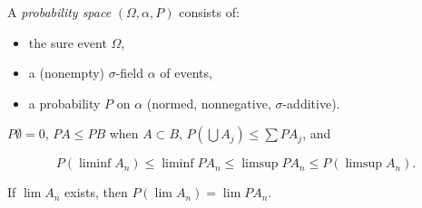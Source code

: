 A \textit{probability space} $(\Omega, \alpha, P)$ consists of:
\begin{itemize}
\item the sure event $\Omega$,
\item a (nonempty) $\sigma$-field $\alpha$ of events,
\item a probability $P$ on $\alpha$ (normed, nonnegative, $\sigma$-additive).
\end{itemize}

$P\emptyset = 0$, $PA \leq PB$ when $A \subset B$, $P(\bigcup A_j) \leq \sum PA_j$, and

$$P(\liminf A_n) \leq \liminf PA_n \leq \limsup PA_n \leq P(\limsup A_n).$$

If $\lim A_n$ exists, then $P(\lim A_n) = \lim PA_n$.
